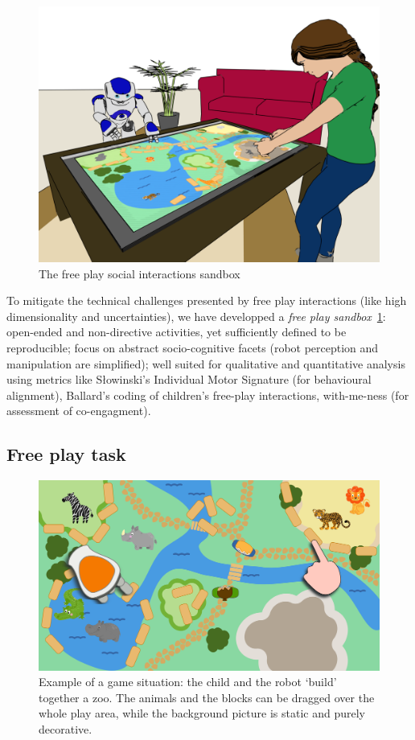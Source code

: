 \documentclass[a4paper]{article}
\begin{document}
\begin{figure}
    \centering
    \includegraphics[width=0.9\linewidth]{setup.png}
    \caption{The free play social interactions sandbox}
    \label{fig|setup}
\end{figure}

To mitigate the technical challenges presented by free play interactions (like
high dimensionality and uncertainties), we have developped a  \emph{free
play sandbox}~\ref{fig|setup}: open-ended and non-directive activities, yet sufficiently
defined to be reproducible; focus on abstract socio-cognitive facets (robot
perception and manipulation are simplified); well suited for qualitative and
quantitative analysis using metrics like Słowinski’s Individual Motor Signature
(for behavioural alignment), Ballard’s coding of children’s free-play
interactions, with-me-ness (for assessment of co-engagment).


\subsection{Free play task}

\begin{figure}
    \centering
    \includegraphics[width=0.9\linewidth]{sandbox}
    \caption{Example of a game situation: the child and the robot `build'
    together a zoo. The animals and the blocks can be dragged over the whole
    play area, while the background picture is static and purely decorative.}
    \label{fig|sandbox}
\end{figure}
\end{document}
